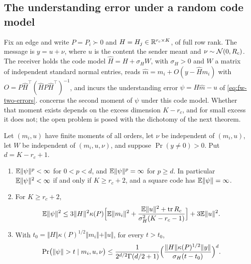 \subsection{The understanding error under a random code model}\label{sec:lrn-understanding}

Fix an edge and write $P=P_i\succ0$ and $H=H_j\in\mathbb{R}^{r_c\times K}$, of full row rank. The message is $y=u+\nu$, where $u$ is the content the sender meant and $\nu\sim\mathcal{N}(0,R_c)$. The receiver holds the code model $\hat H=H+\sigma_HW$, with $\sigma_H>0$ and $W$ a matrix of independent standard normal entries, reads $\hat m=m_i+O(y-\hat Hm_i)$ with $O=P\hat H^\top(\hat HP\hat H^\top)^{-1}$, and incurs the understanding error $\psi=H\hat m-u$ of \cref{eq:fw-two-errors}.  concerns the second moment of $\psi$ under this code model. Whether that moment exists depends on the excess dimension $K-r_c$, and for small excess it does not; the open problem is posed with the dichotomy of the next theorem.

\begin{theorem}\label{thm:lrn-understanding-moment}
Let $(m_i,u)$ have finite moments of all orders, let $\nu$ be independent of $(m_i,u)$, let $W$ be independent of $(m_i,u,\nu)$, and suppose $\Pr(y\ne0)>0$. Put $d=K-r_c+1$.
\begin{enumerate}
\item[(a)] $\mathbb{E}\Vert\psi\Vert^p<\infty$ for $0<p<d$, and $\mathbb{E}\Vert\psi\Vert^p=\infty$ for $p\ge d$. In particular $\mathbb{E}\Vert\psi\Vert^2<\infty$ if and only if $K\ge r_c+2$, and a square code has $\mathbb{E}\Vert\psi\Vert=\infty$.
\item[(b)] For $K\ge r_c+2$,
\begin{equation}\label{eq:lrn-understanding-bound}
\mathbb{E}\Vert\psi\Vert^2\le3\Vert H\Vert^2\kappa(P)\Bigl[\mathbb{E}\Vert m_i\Vert^2+\frac{\mathbb{E}\Vert u\Vert^2+\operatorname{tr} R_c}{\sigma_H^2(K-r_c-1)}\Bigr]+3\mathbb{E}\Vert u\Vert^2.
\end{equation}
\item[(c)] With $t_0=\Vert H\Vert\kappa(P)^{1/2}\Vert m_i\Vert+\Vert u\Vert$, for every $t>t_0$,
\begin{equation}\label{eq:lrn-understanding-tail}
\Pr\bigl(\Vert\psi\Vert>t\mid m_i,u,\nu\bigr)\le\frac{1}{2^{d/2}\Gamma(d/2+1)}\Bigl(\frac{\Vert H\Vert\kappa(P)^{1/2}\Vert y\Vert}{\sigma_H(t-t_0)}\Bigr)^{d}.
\end{equation}
\end{enumerate}
\end{theorem}

